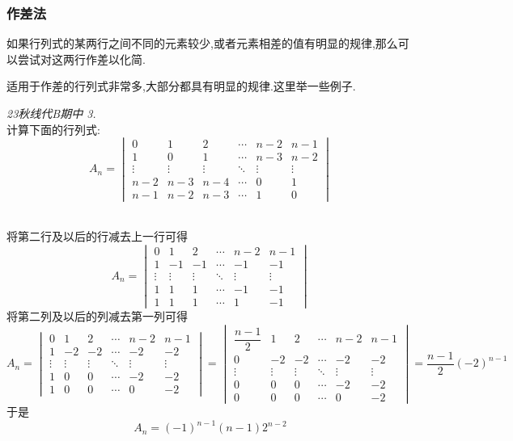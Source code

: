 \documentclass{ctexart}
\begin{document}
\subsubsection{作差法}
\begin{hint}
    如果行列式的某两行之间不同的元素较少,或者元素相差的值有明显的规律,那么可以尝试对这两行作差以化简.
\end{hint}
适用于作差的行列式非常多,大部分都具有明显的规律.这里举一些例子.
\begin{problem}\textit{23秋线代B期中 3.}\\
    计算下面的行列式:
    \[A_n=\begin{vmatrix}
        0&1&2&\cdots&n-2&n-1\\
        1&0&1&\cdots&n-3&n-2\\
        \vdots&\vdots&\vdots&\ddots&\vdots&\vdots\\
        n-2&n-3&n-4&\cdots&0&1\\
        n-1&n-2&n-3&\cdots&1&0
    \end{vmatrix}\]
\end{problem}
\begin{solution}
    \\
    将第二行及以后的行减去上一行可得
    \[A_n=\begin{vmatrix}
        0&1&2&\cdots&n-2&n-1\\
        1&-1&-1&\cdots&-1&-1\\
        \vdots&\vdots&\vdots&\ddots&\vdots&\vdots\\
        1&1&1&\cdots&-1&-1\\
        1&1&1&\cdots&1&-1
    \end{vmatrix}\]
    将第二列及以后的列减去第一列可得
    \[A_n=\begin{vmatrix}
        0&1&2&\cdots&n-2&n-1\\
        1&-2&-2&\cdots&-2&-2\\
        \vdots&\vdots&\vdots&\ddots&\vdots&\vdots\\
        1&0&0&\cdots&-2&-2\\
        1&0&0&\cdots&0&-2
    \end{vmatrix}=\begin{vmatrix}
        \dfrac{n-1}{2}&1&2&\cdots&n-2&n-1\\
        0&-2&-2&\cdots&-2&-2\\
        \vdots&\vdots&\vdots&\ddots&\vdots&\vdots\\
        0&0&0&\cdots&-2&-2\\
        0&0&0&\cdots&0&-2
    \end{vmatrix}=\dfrac{n-1}{2}(-2)^{n-1}\]
    于是
    \[A_n=(-1)^{n-1}(n-1)2^{n-2}\]
\end{solution}
\end{document}
